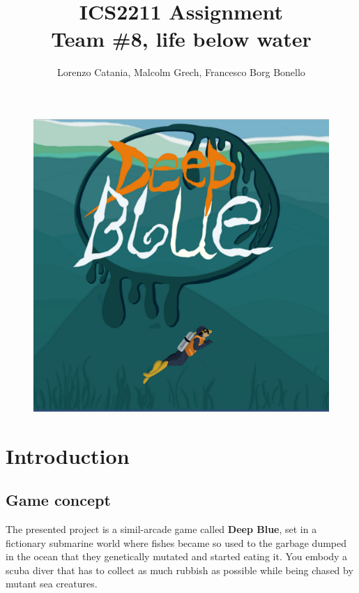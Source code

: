 \documentclass[11pt]{article}
\title{
  ICS2211 Assignment \\
  \large Team \#8, life below water
}
\author{Lorenzo Catania, Malcolm Grech, Francesco Borg Bonello}
\begin{document}
\begin{titlepage}
\begin{figure}
  \centering
  \includegraphics[width=1.0\textwidth]{figures/frontpage}
\end{figure}
\end{titlepage}

\maketitle

{
  \hypersetup{linkcolor=black}
  \tableofcontents
}

\section{Introduction}
\subsection{Game concept}
The presented project is a simil-arcade game called \textbf{Deep Blue}, set in a fictionary submarine world where fishes became so used to the garbage dumped in the ocean that they genetically mutated and started eating it.
You embody a scuba diver that has to collect as much rubbish as possible while being chased by mutant sea creatures.
\end{document}
